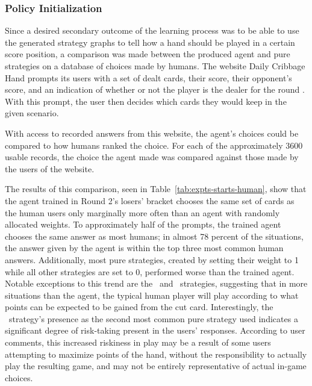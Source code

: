 

\subsubsection*{Policy Initialization}
\label{sec:findings-expts-starts}

Since a desired secondary outcome of the learning process was to be able to use the
generated strategy graphs to tell how a hand should be played in a
certain score position,
a comparison was made between the produced agent and pure strategies
on a database of choices made by humans.
%
The website Daily Cribbage Hand
prompts its users with
a set of dealt cards,
their score,
their opponent's score,
and an indication of whether or not the player is the dealer for the round
\cite{dailycribbagehand}.
%
With this prompt,
the user then decides which cards they would
keep in the given scenario.

With access to recorded answers from this website,
the agent's choices could be compared
to how humans ranked the choice.
%
For each of the approximately 3600 usable records,
the choice the agent made was compared against those made by the users of the
website.

The results of this comparison,
seen in Table~\ref{tab:expts-starts-human},
show that the agent trained in Round 2's losers' bracket chooses the same
set of cards as the human users only marginally more often than an agent with 
randomly allocated weights.
%
To approximately half of the prompts,
the trained agent chooses the same answer as most humans;
in almost 78 percent of the situations,
the answer given by the agent is within the top three most common human answers.
%
Additionally,
most pure strategies,
created by setting their weight to 1 while all other strategies are set to 0,
performed worse than the trained agent.
%
Notable exceptions to this trend are the \handmaxposs\ and \handmaxavg\ 
strategies,
suggesting that in more situations than the agent,
the typical human player will play according to what points can be expected
to be gained from the cut card.
%
Interestingly,
the \handmaxposs\ strategy's presence as the second most common pure strategy
used indicates a significant degree of risk-taking present in the users'
responses.
%
According to user comments,
this increased riskiness in play
may be a result of some users attempting to maximize points of the hand,
without the responsibility to actually play the resulting game,
and may not be entirely representative of actual in-game choices.

